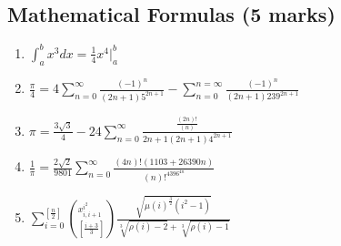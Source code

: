 \documentclass{article}
\begin{document}
\subsection{Mathematical Formulas (5 marks)}
\Large{\begin{enumerate}[label=\arabic*.]
    \item  $\displaystyle \int _{a}^{b} x^3 dx=\frac{1}{4}x^4\Big|_{a}^{b}$
    \item {$ \frac{\pi}{4}=4{\sum\limits_{n=0}^{\infty}} \frac{(-1)^n}{(2n+1)5^{2n+1}}-{\sum\limits_{n=0}^{n=\infty}} \frac{(-1)^n}{(2n+1)239^{2n+1}}$}
   \item{ $\pi=\frac{3\sqrt{3}}{4}-24\sum\limits_{n=0}^{\infty} \frac{\frac{(2n)!}{(n)}}{2n+1(2n+1)4^{2n+1}}$} 
   \item{$\frac{1}{\pi}=\frac{2\sqrt{2}}{9801}\sum\limits_{n=0}^{\infty}\frac{(4n)!(1103+26390n)}{(n)!^4396^{4n}}$}
   \item{ $\sum_{i=0}^{[\frac{n}{2}]}(^{x^{i^2}_{i,i+1}}_{[\frac{i+3}{3}]})\frac{\sqrt{\mu(i)^{\frac{3}{2}}(i^2-1)}}{\sqrt[3]{\rho(i)-2}+\sqrt[3]{\rho(i)-1}}$}
\end{enumerate}}
\newpage
\end{document}

